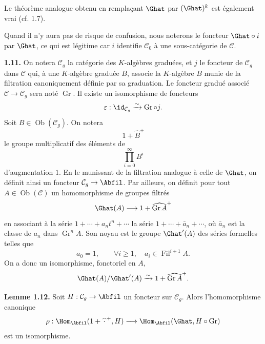 \documentclass[11pt]{article}
\newcommand{\Fil}{\operatorname{Fil}}
\begin{document}
Le théorème analogue obtenu en remplaçant \(\Ghat\) par \((\Ghat)^k\) est également vrai (cf. 1.7).

Quand il n'y aura pas de risque de confusion, nous noterons le foncteur \(\Ghat\circ i\) par \(\Ghat\), ce qui est légitime car \(i\) identifie \(\mathcal C_0\) à une sous-catégorie de \(\mathcal C\).

\textbf{1.11.} On notera \(\mathcal C_g\) la catégorie des \(K\)-algèbres graduées, et \(j\) le foncteur de \(\mathcal C_g\) dans \(\mathcal C\) qui, à une \(K\)-algèbre graduée \(B\), associe la \(K\)-algèbre \(B\) munie de la filtration canoniquement définie par sa graduation. Le foncteur gradué associé \(\mathcal C\to\mathcal C_g\) sera noté \(\operatorname{Gr}\). Il existe un isomorphisme de foncteurs
\[
  \varepsilon:\id_{\mathcal C_g}\xrightarrow{\sim}\operatorname{Gr}\circ j.
\]
Soit \(B\in\operatorname{Ob}(\mathcal C_g)\). On notera
\[
  1+\widehat B^+
\]
le groupe multiplicatif des éléments de
\[
  \prod_{i=0}^{\infty}B^i
\]
d'augmentation \(1\). En le munissant de la filtration analogue à celle de \(\Ghat\), on définit ainsi un foncteur \(\mathcal C_g\to\Abfil\). Par ailleurs, on définit pour tout \(A\in\operatorname{Ob}(\mathcal C)\) un homomorphisme de groupes filtrés
\[
  \Ghat(A)\longrightarrow 1+\widehat{\operatorname{Gr}A}^{+}
\]
en associant à la série \(1+\cdots+a_nt^n+\cdots\) la série \(1+\cdots+\bar a_n+\cdots\), où \(\bar a_n\) est la classe de \(a_n\) dans \(\operatorname{Gr}^nA\). Son noyau est le groupe \(\Ghat'(A)\) des séries formelles telles que
\[
  a_0=1,\qquad \forall i\geq1,\quad a_i\in\Fil^{i+1}A.
\]
On a donc un isomorphisme, fonctoriel en \(A\),
\[
  \Ghat(A)/\Ghat'(A)\xrightarrow{\sim}1+\widehat{\operatorname{Gr}A}^{+}.
\]

\textbf{Lemme 1.12.} Soit \(H:\mathcal C_g\to\Abfil\) un foncteur sur \(\mathcal C_g\). Alors l'homomorphisme canonique
\[
  \rho:\Hom_{\Abfil}(1+\widehat{\,\cdot\,}^{+},H)
  \longrightarrow
  \Hom_{\Abfil}(\Ghat,H\circ\operatorname{Gr})
\]
est un isomorphisme.
\end{document}
